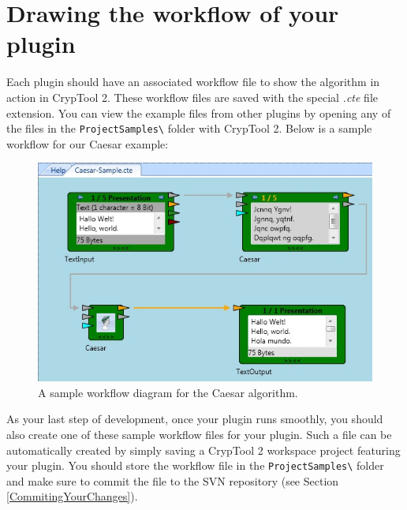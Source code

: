 \section{Drawing the workflow of your plugin}
\label{DrawingTheWorkfloweOfYourPlugin}

Each plugin should have an associated workflow file to show the algorithm in action in CrypTool 2. These workflow files are saved with the special \textit{.cte} file extension. You can view the example files from other plugins by opening any of the files in the \texttt{ProjectSamples\textbackslash} folder with CrypTool 2. Below is a sample workflow for our Caesar example:

\begin{figure}[h]
	\centering
		\includegraphics{figures/sample.jpg}
	\caption{A sample workflow diagram for the Caesar algorithm.}
	\label{fig:sample}
\end{figure}

As your last step of development, once your plugin runs smoothly, you should also create one of these sample workflow files for your plugin. Such a file can be automatically created by simply saving a CrypTool 2 workspace project featuring your plugin. You should store the workflow file in the \texttt{ProjectSamples\textbackslash} folder and make sure to commit the file to the SVN repository (see Section \ref{CommitingYourChanges}).
